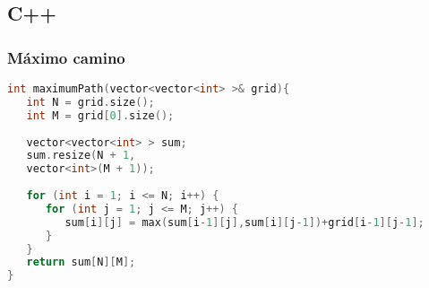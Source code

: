 \subsection{C++}
\subsubsection{Máximo camino}
\begin{lstlisting}[language=C++]
int maximumPath(vector<vector<int> >& grid){
   int N = grid.size();
   int M = grid[0].size();
   
   vector<vector<int> > sum;
   sum.resize(N + 1,
   vector<int>(M + 1));
	
   for (int i = 1; i <= N; i++) {
      for (int j = 1; j <= M; j++) {
         sum[i][j] = max(sum[i-1][j],sum[i][j-1])+grid[i-1][j-1];
      }
   }
   return sum[N][M];
}
\end{lstlisting}

